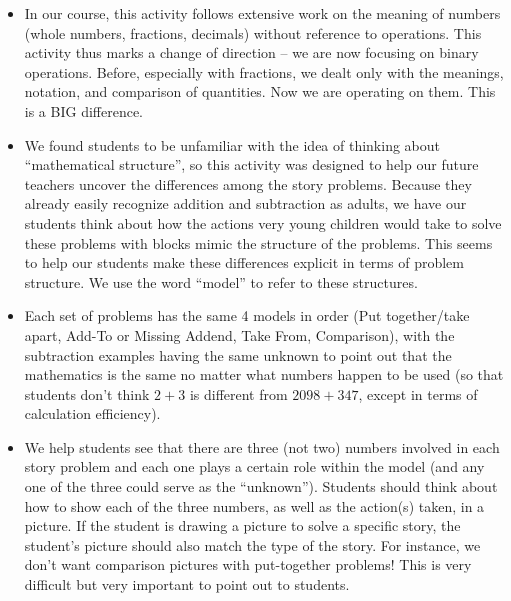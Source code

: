 \documentclass[nooutcomes,noauthor,handout]{ximera}
\begin{document}
\begin{instructorNotes}
\begin{itemize}
	\item In our course, this activity follows extensive work on the meaning of numbers (whole numbers, fractions, decimals) without reference to operations.  This activity thus marks a change of direction -- we are now focusing on binary operations. Before, especially with fractions, we dealt only with the meanings, notation, and comparison of quantities.  Now we are operating on them. This is a BIG difference.
	\item We found students to be unfamiliar with the idea of thinking about ``mathematical structure'', so this activity was designed to help our future teachers uncover the differences among the story problems.  Because they already easily recognize addition and subtraction as adults, we have our students think about how the actions very young children would take to solve these problems with blocks mimic the structure of the problems. This seems to help our students make these differences explicit in terms of problem structure.  We use the word ``model'' to refer to these structures.
	\item Each set of problems has the same 4 models in order (Put together/take apart, Add-To or Missing Addend, Take From, Comparison), with the subtraction examples having the same unknown to point out that the mathematics is the same no matter what numbers happen to be used (so that students don't think $2+3$ is different from $2098+347$, except in terms of calculation efficiency).
	\item We help students see that there are three (not two) numbers involved in each story problem and each one plays a certain role within the model (and any one of the three could serve as the ``unknown'').  Students should think about how to show each of the three numbers, as well as the action(s) taken, in a picture.  If the student is drawing a picture to solve a specific story, the student's picture should also match the type of the story. For instance, we don't want comparison pictures with put-together problems! This is very difficult but very important to point out to students.

\end{itemize}
\end{instructorNotes}
\end{document}

